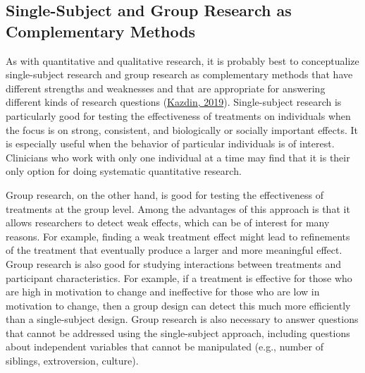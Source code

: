 \documentclass[
]{krantz}
\begin{document}
\hypertarget{single-subject-and-group-research-as-complementary-methods}{%
\subsection*{Single-Subject and Group Research as Complementary Methods}\label{single-subject-and-group-research-as-complementary-methods}}


As with quantitative and qualitative research, it is probably best to conceptualize single-subject research and group research as complementary methods that have different strengths and weaknesses and that are appropriate for answering different kinds of research questions (\protect\hyperlink{ref-kazdin2019single}{Kazdin, 2019}). Single-subject research is particularly good for testing the effectiveness of treatments on individuals when the focus is on strong, consistent, and biologically or socially important effects. It is especially useful when the behavior of particular individuals is of interest. Clinicians who work with only one individual at a time may find that it is their only option for doing systematic quantitative research.

Group research, on the other hand, is good for testing the effectiveness of treatments at the group level. Among the advantages of this approach is that it allows researchers to detect weak effects, which can be of interest for many reasons. For example, finding a weak treatment effect might lead to refinements of the treatment that eventually produce a larger and more meaningful effect. Group research is also good for studying interactions between treatments and participant characteristics. For example, if a treatment is effective for those who are high in motivation to change and ineffective for those who are low in motivation to change, then a group design can detect this much more efficiently than a single-subject design. Group research is also necessary to answer questions that cannot be addressed using the single-subject approach, including questions about independent variables that cannot be manipulated (e.g., number of siblings, extroversion, culture).
\end{document}
